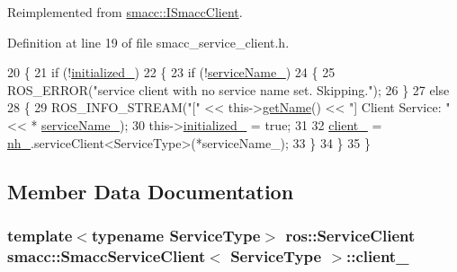 Reimplemented from \hyperlink{classsmacc_1_1ISmaccClient_a974ebb6ad6cf812e7b9de6b78b3d901f}{smacc\+::\+I\+Smacc\+Client}.



Definition at line 19 of file smacc\+\_\+service\+\_\+client.\+h.


\begin{DoxyCode}
20     \{
21         \textcolor{keywordflow}{if} (!\hyperlink{classsmacc_1_1SmaccServiceClient_a251b147a783f05d13edb272b85f64982}{initialized\_})
22         \{
23             \textcolor{keywordflow}{if} (!\hyperlink{classsmacc_1_1SmaccServiceClient_a93cf1653e9d7a0f4aa25dbb8ae7d07fc}{serviceName\_})
24             \{
25                 ROS\_ERROR(\textcolor{stringliteral}{"service client with no service name set. Skipping."});
26             \}
27             \textcolor{keywordflow}{else}
28             \{
29                 ROS\_INFO\_STREAM(\textcolor{stringliteral}{"["} << this->\hyperlink{classsmacc_1_1ISmaccClient_a20846aabfd1de832aa27d7a8237a1742}{getName}() << \textcolor{stringliteral}{"] Client Service: "} << *
      \hyperlink{classsmacc_1_1SmaccServiceClient_a93cf1653e9d7a0f4aa25dbb8ae7d07fc}{serviceName\_});
30                 this->\hyperlink{classsmacc_1_1SmaccServiceClient_a251b147a783f05d13edb272b85f64982}{initialized\_} = \textcolor{keyword}{true};
31 
32                 \hyperlink{classsmacc_1_1SmaccServiceClient_a6eed795ca67ec50096a9e5695d4281c6}{client\_} = \hyperlink{classsmacc_1_1SmaccServiceClient_a6e5e8b77b4c7137f9c820b09c8f661b5}{nh\_}.serviceClient<ServiceType>(*serviceName\_);
33             \}
34         \}
35     \}
\end{DoxyCode}


\subsection{Member Data Documentation}
\subsubsection[{\texorpdfstring{client\+\_\+}{client_}}]{\setlength{\rightskip}{0pt plus 5cm}template$<$typename Service\+Type$>$ ros\+::\+Service\+Client {\bf smacc\+::\+Smacc\+Service\+Client}$<$ Service\+Type $>$\+::client\+\_\+\hspace{0.3cm}{\ttfamily [protected]}}\hypertarget{classsmacc_1_1SmaccServiceClient_a6eed795ca67ec50096a9e5695d4281c6}{}\label{classsmacc_1_1SmaccServiceClient_a6eed795ca67ec50096a9e5695d4281c6}


